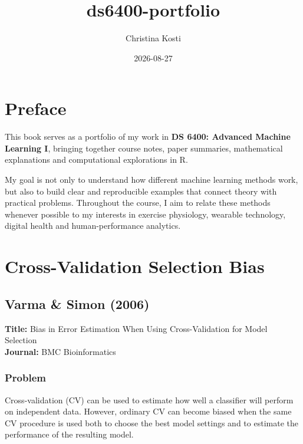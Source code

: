 \documentclass[
  letterpaper,
  DIV=11,
  numbers=noendperiod]{scrreprt}
\title{ds6400-portfolio}
\author{Christina Kosti}
\date{2026-08-27}
\renewcommand*\contentsname{Table of contents}
\newcommand\contentsname{Table of contents}
\begin{document}
\maketitle

\renewcommand*\contentsname{Table of contents}
{
\setcounter{tocdepth}{2}
\tableofcontents
}


\chapter*{Preface}\label{preface}


This book serves as a portfolio of my work in \textbf{DS 6400: Advanced
Machine Learning I}, bringing together course notes, paper summaries,
mathematical explanations and computational explorations in R.

My goal is not only to understand how different machine learning methods
work, but also to build clear and reproducible examples that connect
theory with practical problems. Throughout the course, I aim to relate
these methods whenever possible to my interests in exercise physiology,
wearable technology, digital health and human-performance analytics.


\chapter{Cross-Validation Selection
Bias}\label{cross-validation-selection-bias}

\section{Varma \& Simon (2006)}\label{varma-simon-2006}

\textbf{Title:} Bias in Error Estimation When Using Cross-Validation for
Model Selection\\
\textbf{Journal:} BMC Bioinformatics

\subsection{Problem}\label{problem}

Cross-validation (CV) can be used to estimate how well a classifier will
perform on independent data. However, ordinary CV can become biased when
the same CV procedure is used both to choose the best model settings and
to estimate the performance of the resulting model.
\end{document}
